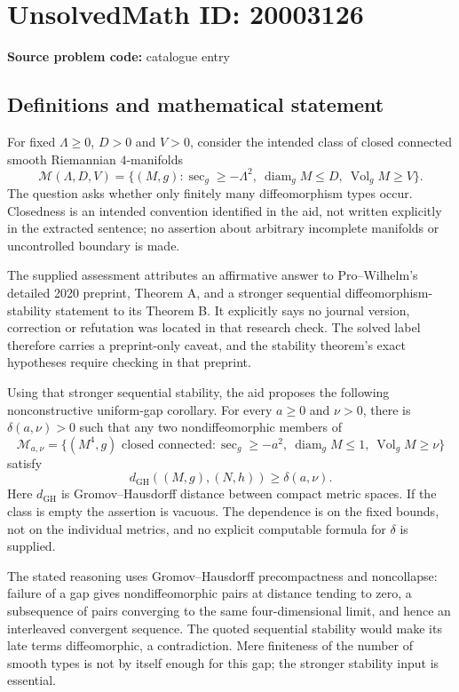 \documentclass[11pt]{article}
\begin{document}
\section*{UnsolvedMath ID: 20003126}
\textbf{Source problem code:} catalogue entry
\subsection{Definitions and mathematical statement}
For fixed $\Lambda\geq0$, $D>0$ and $V>0$, consider the intended class of closed connected smooth Riemannian $4$-manifolds
\[
 \mathcal M(\Lambda,D,V)=\{(M,g):
 \sec_g\geq-\Lambda^2,\ \operatorname{diam}_gM\leq D,
 \ \operatorname{Vol}_gM\geq V\}.
\]
The question asks whether only finitely many diffeomorphism types occur. Closedness is an intended convention identified in the aid, not written explicitly in the extracted sentence; no assertion about arbitrary incomplete manifolds or uncontrolled boundary is made.

The supplied assessment attributes an affirmative answer to Pro--Wilhelm's detailed 2020 preprint, Theorem A, and a stronger sequential diffeomorphism-stability statement to its Theorem B. It explicitly says no journal version, correction or refutation was located in that research check. The solved label therefore carries a preprint-only caveat, and the stability theorem's exact hypotheses require checking in that preprint.

Using that stronger sequential stability, the aid proposes the following nonconstructive uniform-gap corollary. For every $a\geq0$ and $\nu>0$, there is $\delta(a,\nu)>0$ such that any two nondiffeomorphic members of
\[
 \mathcal M_{a,\nu}=
 \{(M^4,g)\text{ closed connected}:\sec_g\geq-a^2,
          \ \operatorname{diam}_gM\leq1,
          \ \operatorname{Vol}_gM\geq\nu\}
\]
satisfy
\[
 d_{\mathrm{GH}}((M,g),(N,h))\geq\delta(a,\nu).
\]
Here $d_{\mathrm{GH}}$ is Gromov--Hausdorff distance between compact metric spaces. If the class is empty the assertion is vacuous. The dependence is on the fixed bounds, not on the individual metrics, and no explicit computable formula for $\delta$ is supplied.

The stated reasoning uses Gromov--Hausdorff precompactness and noncollapse: failure of a gap gives nondiffeomorphic pairs at distance tending to zero, a subsequence of pairs converging to the same four-dimensional limit, and hence an interleaved convergent sequence. The quoted sequential stability would make its late terms diffeomorphic, a contradiction. Mere finiteness of the number of smooth types is not by itself enough for this gap; the stronger stability input is essential.
\end{document}
